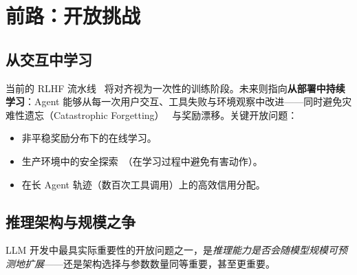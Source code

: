 \section{前路：开放挑战}
\label{the-road-ahead-open-challenges}

\subsection{从交互中学习}
\label{learning-from-interaction}

当前的 RLHF 流水线~\cite{ouyang2022training} 将对齐视为一次性的训练阶段。未来则指向\textbf{从部署中持续学习}：Agent 能够从每一次用户交互、工具失败与环境观察中改进——同时避免灾难性遗忘（Catastrophic Forgetting）~\cite{kirkpatrick2017overcoming} 与奖励漂移。关键开放问题：

\begin{itemize}
  \item 非平稳奖励分布下的在线学习。
  \item 生产环境中的安全探索~\cite{garcia2015comprehensive}（在学习过程中避免有害动作）。
  \item 在长 Agent 轨迹（数百次工具调用）上的高效信用分配。
\end{itemize}

\subsection{推理架构与规模之争}
\label{subsec:reasoning-vs-scale}

LLM 开发中最具实际重要性的开放问题之一，是\emph{推理能力是否会随模型规模可预测地扩展}——还是架构选择与参数数量同等重要，甚至更重要。

